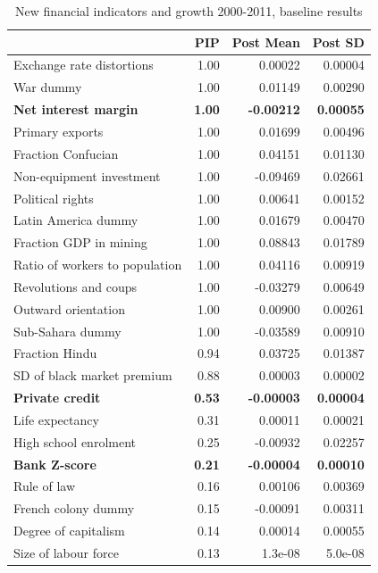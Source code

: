 \begin{refsection}
\begin{table}[!htbp]
	\centering
	\caption{New financial indicators and growth 2000-2011, baseline results}
		\label{ch2tab:BMAgrowth2000-2011}
	\footnotesize
	\begin{tabular}{lrrr}
		\toprule
		& PIP & Post Mean & Post SD \\ 
		\midrule
		  Exchange rate distortions & 1.00 & 0.00022 & 0.00004 \\ 
		  War dummy & 1.00 & 0.01149 & 0.00290 \\ 
		  \textbf{Net interest margin} & \textbf{1.00} & \textbf{-0.00212} & \textbf{0.00055} \\ 
		  Primary exports & 1.00 & 0.01699 & 0.00496 \\ 
		  Fraction Confucian & 1.00 & 0.04151 & 0.01130 \\ 
		  Non-equipment investment & 1.00 & -0.09469 & 0.02661 \\ 
		  Political rights & 1.00 & 0.00641 & 0.00152 \\ 
		  Latin America dummy & 1.00 & 0.01679 & 0.00470 \\ 
		  Fraction GDP in mining & 1.00 & 0.08843 & 0.01789 \\ 
		  Ratio of workers to population & 1.00 & 0.04116 & 0.00919 \\ 
		  Revolutions and coups & 1.00 & -0.03279 & 0.00649 \\ 
		  Outward orientation & 1.00 & 0.00900 & 0.00261 \\ 
		  Sub-Sahara dummy & 1.00 & -0.03589 & 0.00910 \\ 
		  Fraction Hindu & 0.94 & 0.03725 & 0.01387 \\ 
		  SD of black market premium & 0.88 & 0.00003 & 0.00002 \\ 
		  \textbf{Private credit} & \textbf{0.53} & \textbf{-0.00003} & \textbf{0.00004} \\ 
		  Life expectancy & 0.31 & 0.00011 & 0.00021 \\ 
		  High school enrolment & 0.25 & -0.00932 & 0.02257 \\ 
		  \textbf{Bank Z-score} & \textbf{0.21} & \textbf{-0.00004} & \textbf{0.00010} \\ 
		  Rule of law & 0.16 & 0.00106 & 0.00369 \\ 
		  French colony dummy & 0.15 & -0.00091 & 0.00311 \\ 
		  Degree of capitalism & 0.14 & 0.00014 & 0.00055 \\ 
		  Size of labour force & 0.13 & 1.3e-08 & 5.0e-08 \\ 

\end{tabular}
\end{table}
\end{refsection}
